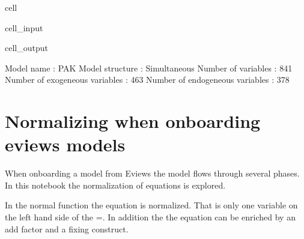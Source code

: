 \documentclass[letterpaper,10pt,english]{jupyterBook}
\begin{document}
\begin{sphinxuseclass}{cell}\begin{sphinxVerbatimInput}

\begin{sphinxuseclass}{cell_input}
\begin{sphinxVerbatim}[commandchars=\\\{\}]
\PYG{p}{[}\PYG{p}{]}
\end{sphinxVerbatim}

\end{sphinxuseclass}\end{sphinxVerbatimInput}
\begin{sphinxVerbatimOutput}

\begin{sphinxuseclass}{cell_output}
\begin{sphinxVerbatim}[commandchars=\\\{\}]
\PYGZlt{}
Model name                              :                  PAK 
Model structure                         :         Simultaneous 
Number of variables                     :                  841 
Number of exogeneous  variables         :                  463 
Number of endogeneous variables         :                  378 
\PYGZgt{}
\end{sphinxVerbatim}

\end{sphinxuseclass}\end{sphinxVerbatimOutput}

\end{sphinxuseclass}
\sphinxstepscope


\chapter{Normalizing when onboarding  eviews models}
\label{\detokenize{content/howto/onboard/eviews/Normalizing when onboarding eviews:normalizing-when-onboarding-eviews-models}}\label{\detokenize{content/howto/onboard/eviews/Normalizing when onboarding eviews::doc}}
\sphinxAtStartPar
When onboarding a model from Eviews the model flows through several phases.
In this notebook the normalization of equations is explored.

\sphinxAtStartPar
In the normal function the equation is normalized. That is only one variable on the left hand side of the =. In addition the
the equation can be enriched by an add factor and a fixing construct.
\end{document}
